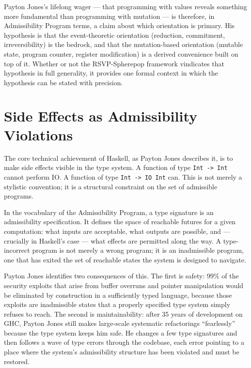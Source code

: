 \documentclass[12pt]{article}
\begin{document}
Payton Jones's lifelong wager — that programming with values reveals something
more fundamental than programming with mutation — is therefore, in Admissibility
Program terms, a claim about which orientation is primary. His hypothesis is that
the event-theoretic orientation (reduction, commitment, irreversibility) is the
bedrock, and that the mutation-based orientation (mutable state, program counter,
register modification) is a derived convenience built on top of it. Whether or
not the RSVP-Spherepop framework vindicates that hypothesis in full generality,
it provides one formal context in which the hypothesis can be stated with
precision.

\section{Side Effects as Admissibility Violations}

The core technical achievement of Haskell, as Payton Jones describes it, is to
make side effects visible in the type system. A function of type \texttt{Int ->
Int} cannot perform IO. A function of type \texttt{Int -> IO Int} can. This is
not merely a stylistic convention; it is a structural constraint on the set of
admissible programs.

In the vocabulary of the Admissibility Program, a type signature is an
admissibility specification. It defines the space of reachable futures for a
given computation: what inputs are acceptable, what outputs are possible, and —
crucially in Haskell's case — what effects are permitted along the way. A type-
incorrect program is not merely a wrong program; it is an inadmissible program,
one that has exited the set of reachable states the system is designed to
navigate.

Payton Jones identifies two consequences of this. The first is safety: 99\% of
the security exploits that arise from buffer overruns and pointer manipulation
would be eliminated by construction in a sufficiently typed language, because
those exploits are inadmissible states that a properly specified type system
simply refuses to reach. The second is maintainability: after 35 years of
development on GHC, Payton Jones still makes large-scale systematic refactorings
``fearlessly'' because the type system keeps him safe. He changes a few type
signatures and then follows a wave of type errors through the codebase,
each error pointing to a place where the system's admissibility structure has
been violated and must be restored.
\end{document}
